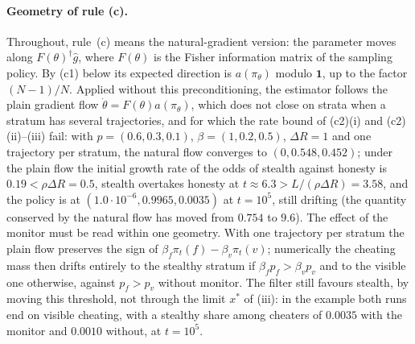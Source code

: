 \paragraph{Geometry of rule (c).} Throughout, rule~(c) means the natural-gradient version: the parameter moves along $F(\theta)^{\dagger}\hat g$, where $F(\theta)$ is the Fisher information matrix of the sampling policy. By (c1) below its expected direction is $a(\pi_\theta)$ modulo $\mathbf 1$, up to the factor $(N-1)/N$. Applied without this preconditioning, the estimator follows the plain gradient flow $\dot\theta=F(\theta)a(\pi_\theta)$, which does not close on strata when a stratum has several trajectories, and for which the rate bound of (c2)(i) and (c2)(ii)--(iii) fail: with $p=(0.6,0.3,0.1)$, $\beta=(1,0.2,0.5)$, $\Delta R=1$ and one trajectory per stratum, the natural flow converges to $(0,0.548,0.452)$; under the plain flow the initial growth rate of the odds of stealth against honesty is $0.19<\rho\Delta R=0.5$, stealth overtakes honesty at $t\approx6.3>L/(\rho\Delta R)=3.58$, and the policy is at $(1.0\cdot10^{-6},0.9965,0.0035)$ at $t=10^{5}$, still drifting (the quantity conserved by the natural flow has moved from $0.754$ to $9.6$). The effect of the monitor must be read within one geometry. With one trajectory per stratum the plain flow preserves the sign of $\beta_f\pi_t(f)-\beta_v\pi_t(v)$; numerically the cheating mass then drifts entirely to the stealthy stratum if $\beta_fp_f>\beta_vp_v$ and to the visible one otherwise, against $p_f>p_v$ without monitor. The filter still favours stealth, by moving this threshold, not through the limit $x^\ast$ of (iii): in the example both runs end on visible cheating, with a stealthy share among cheaters of $0.0035$ with the monitor and $0.0010$ without, at $t=10^5$.

